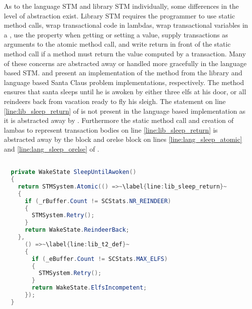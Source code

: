 As to the language \ac{STM} and library \ac{STM} individually, some differences in the level of abstraction exist. Library \ac{STM} requires the programmer to use static method calls, wrap transactional code in lambdas, wrap transactional variables in a , use the  property when getting or setting a value, supply  transactions as arguments to the atomic method call, and write return in front of the static method call if a method must return the value computed by a transaction. Many of these concerns are abstracted away or handled more gracefully in the language based \ac{STM}.  and  present an implementation of the  method from the library and language based Santa Claus problem implementations, respectively. The method ensures that santa sleeps until he is awoken by either three elfs at his door, or all reindeers back from vacation ready to fly his sleigh. The  statement on line \ref{line:lib_sleep_return} of  is not present in the language based implementation as it is abstracted away by \stmnamesp. Furthermore the static method call and creation of lambas to represent transaction bodies on line \ref{line:lib_sleep_return} is abstracted away by the  block and orelse block on lines \ref{line:lang_sleep_atomic} and \ref{line:lang_sleep_orelse} of .

\begin{lstlisting}[float,label=lst:lib_SleepUntilAwoken,
  caption={\bscode{SleepUntilAwoken} Method - \ac{STM} Library},
  language=Java,  
  showspaces=false,
  showtabs=false,
  breaklines=true,
  showstringspaces=false,
  breakatwhitespace=true,
  escapechar=~,
  commentstyle=\color{greencomments},
  keywordstyle=\color{bluekeywords},
  stringstyle=\color{redstrings},
  morekeywords={atomic, retry, orelse, var, get, set, ref, out}]  % Start your code-block

  private WakeState SleepUntilAwoken()
  {
    return STMSystem.Atomic(() =>~\label{line:lib_sleep_return}~
    {
      if (_rBuffer.Count != SCStats.NR_REINDEER)
      {
        STMSystem.Retry();
      }
      return WakeState.ReindeerBack;
    },
      () =>~\label{line:lib_t2_def}~
      {
        if (_eBuffer.Count != SCStats.MAX_ELFS)
        {
          STMSystem.Retry();
        }
        return WakeState.ElfsIncompetent;
      });
  }
\end{lstlisting}

